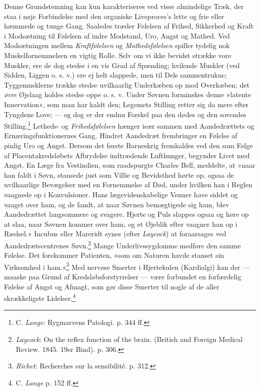 \documentclass[12pt,a4paper,openany]{book}
\newcommand{\opage}[1]{\marginnote{\footnotesize\textit{[#1]}}}
\begin{document}
Denne Grundstemning kan kun karakteriseres ved visse almindelige Træk,
der staa i nøje Forbindelse med den organiske Livsproces’s lette og frie
eller hæmmede og tunge Gang. Saaledes træder Følelsen af Frihed,
Sikkerhed og Kraft i Modsætning til Følelsen af indre Modstand, Uro,
Angst og Mathed. Ved Modsætningen mellem \emph{Kraftfølelsen} og
\emph{Mathedsfølelsen} spiller tydelig nok Muskelfornemmelsen en vigtig
Rolle. Selv om vi ikke bevidst strække vore Muskler, ere de dog stedse i
en vis Grad af Spænding; hvilende Muskler (ved Sidden, Liggen o. s. v.)
ere ej helt slappede, men til Dels sammentrukne; Tyggemusklerne trække
stedse uvilkaarlig
\opage{274}Underkæben op mod Overkæben; det \emph{øvre} Øjelaag holdes
stedse oppe o. s. v. Under Søvnen forminskes denne »latente
Innervation«, som man har kaldt den; Legemets Stilling retter sig da
mere efter Tyngdens Love; --- og dog er der endnu Forskel paa den dødes
og den sovendes Stilling.\footnote[1]{C. \emph{Lange}: Rygmarvens
Patologi. p. 344 ff.} Letheds- og \emph{Frihedsfølelsen} hænger især
sammen med Aandedrættets og Ernæringsfunktionernes Gang. Hindret
Aandedræt frembringer en Følelse af pinlig Uro og Angst. Dersom det
første Barneskrig fremkaldes ved den som Følge af Placentakredsløbets
Afbrydelse indtrædende Lufthunger, begynder Livet med Angst. En Læge fra
Vestindien, som raadspurgte Charles Bell, meddelte, at »naar han faldt i
Søvn, stansede just som Villie og Bevidsthed hørte op, ogsaa de
uvilkaarlige Bevægelser med en Fornemmelse af Død, under hvilken han i
Reglen vaagnede op i Konvulsioner. Hans lægevidenskabelige Venner have
siddet og vaaget over ham, og de fandt, at naar Søvnen bemægtigede sig
ham, blev Aandedrættet langsommere og svagere. Hjerte og Puls slappes
ogsaa og høre op at slaa, naar Søvnen kommer over ham, og et Øjeblik
efter vaagner han op i Rædsel.« Incubus eller Mareridt synes (efter
\emph{Laycock}) at foraarsages ved Aandedrætscentrenes
Søvn.\footnote[2]{\emph{Laycock}: On the reflex function of the brain. (British and Foreign Medical Review. 1845. 19er Bind). p. 306.} Mange
Underlivssygdomme medføre den samme Følelse. Det forekommer Patienten,
»som om Naturen havde stanset sin Virksomhed i ham.«\footnote[3]{\emph{Richet}: Recherches sur la sensibilité. p. 312.} Med nervøse Smerter i
Hjertekulen (Kardialgi) kan der --- maaske paa Grund af
Kredsløbsforstyrrelser --- være forbundet en forfærdelig Følelse af
Angst og Afmagt, som gør disse Smerter til nogle af de aller
skrækkeligste Lidelser,\footnote[4]{C. \emph{Lange} p. 152 ff.}
\end{document}
